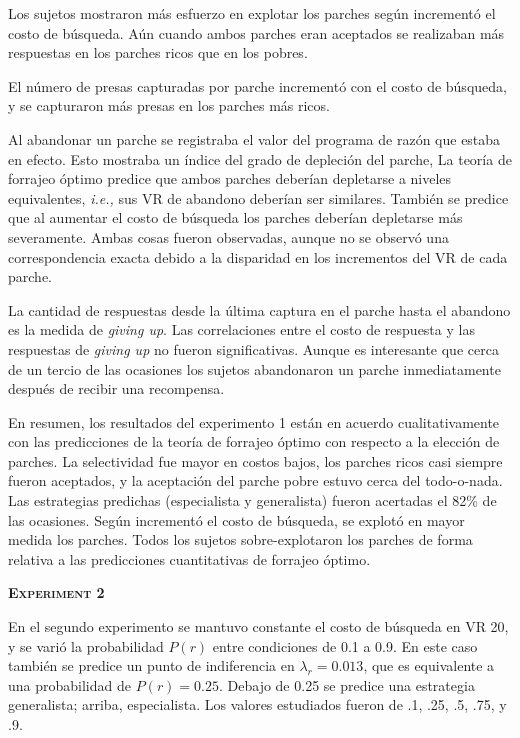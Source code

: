 \documentclass[a4paper,12pt]{article}
\begin{document}
Los sujetos mostraron más esfuerzo en explotar los parches según incrementó el costo de búsqueda. Aún cuando ambos parches eran aceptados se realizaban más respuestas en los parches ricos que en los pobres.

El número de presas capturadas por parche incrementó con el costo de búsqueda, y se capturaron más presas en los parches más ricos.

Al abandonar un parche se registraba el valor del programa de razón que estaba en efecto. Esto mostraba un índice del grado de depleción del parche, La teoría de forrajeo óptimo predice que ambos parches deberían depletarse a niveles equivalentes, {\itshape i.e.,} sus VR de abandono deberían ser similares. También se predice que al aumentar el costo de búsqueda los parches deberían depletarse más severamente. Ambas cosas fueron observadas, aunque no se observó una correspondencia exacta debido a la disparidad en los incrementos del VR de cada parche.

La cantidad de respuestas desde la última captura en el parche hasta el abandono es la medida de {\itshape giving up}. Las correlaciones entre el costo de respuesta y las respuestas de {\itshape giving up} no fueron significativas. Aunque es interesante que cerca de un tercio de las ocasiones los sujetos abandonaron un parche inmediatamente después de recibir una recompensa.

En resumen, los resultados del experimento 1 están en acuerdo cualitativamente con las predicciones de la teoría de forrajeo óptimo con respecto a la elección de parches. La selectividad fue mayor en costos bajos, los parches ricos casi siempre fueron aceptados, y la aceptación del parche pobre estuvo cerca del todo-o-nada. Las estrategias predichas (especialista y generalista) fueron acertadas el 82\% de las ocasiones. Según incrementó el costo de búsqueda, se explotó en mayor medida los parches. Todos los sujetos sobre-explotaron los parches de forma relativa a las predicciones cuantitativas de forrajeo óptimo.

{\scshape\bfseries Experiment 2}

En el segundo experimento se mantuvo constante el costo de búsqueda en VR 20, y se varió la probabilidad $P(r)$ entre condiciones de 0.1 a 0.9. En este caso también se predice un punto de indiferencia en $\lambda_{r} = 0{.}013$, que es equivalente a una probabilidad de $P(r) =  0{.}25$. Debajo de 0.25 se predice una estrategia generalista; arriba, especialista. Los valores estudiados fueron de .1, .25, .5, .75, y .9.
\end{document}
